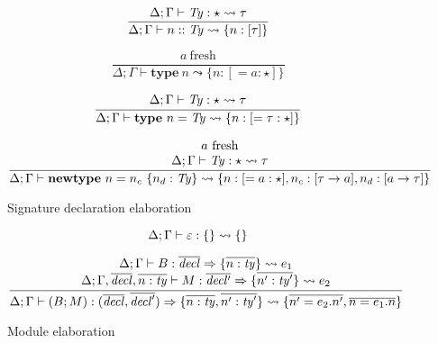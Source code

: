\documentclass{article}
\begin{document}
\begin{figure}[H]

\[
\frac{
\Delta; \Gamma \vdash \mathit{Ty} : \star \leadsto \tau
}{
\Delta; \Gamma \vdash n :: \mathit{Ty} \leadsto \{ n : [ \tau ] \}
}
\]

\[
\frac{
a~\mbox{fresh}
}{
\Delta; \Gamma \vdash \mathbf{type}~n \leadsto \{ n : [ = a : \star ] \}
}
\]

\[
\frac{
\begin{array}{c}
\Delta; \Gamma \vdash \mathit{Ty} : \star \leadsto \tau \\
\end{array}
}{
\Delta; \Gamma \vdash \mathbf{type}~n = \mathit{Ty} \leadsto
    \{ n : [ = \tau : \star ]
    \}
}
\]

\[
\frac{
\begin{array}{c}
a~\mbox{fresh} \\
\Delta; \Gamma \vdash \mathit{Ty} : \star \leadsto \tau \\
\end{array}
}{
\Delta; \Gamma \vdash \mathbf{newtype}~n = n_c~\{ n_d : \mathit{Ty} \} \leadsto
    \{ n : [ = a : \star ]
     , n_c : [\tau \rightarrow a]
     , n_d : [a \rightarrow \tau]
    \}
}
\]
\caption{Signature declaration elaboration}
\end{figure}

\begin{figure}[H]

\[
\Delta; \Gamma \vdash \varepsilon : \{\} \leadsto{} \{\}
\]

\[
\frac{
\begin{array}{c}
\Delta; \Gamma \vdash B : \overline{\mathit{decl}} \Rightarrow \{ \overline{ n : \mathit{ty} } \} \leadsto{} e_1 \\
\Delta; \Gamma, \overline{\mathit{decl}}, \overline{n : \mathit{ty}} \vdash M : \overline{\mathit{decl'}} \Rightarrow \{ \overline{ n' : \mathit{ty}'} \} \leadsto{} e_2
\end{array}
}{
\Delta; \Gamma \vdash (B; M) : (\overline{\mathit{decl}}, \overline{\mathit{decl}'}) \Rightarrow \{ \overline{n : \mathit{ty}}, \overline{n' : \mathit{ty}'} \}
\leadsto{}  \{ \overline{n' = e_2.n'}, \overline{n = e_1.n} \} 
}
\]
\caption{Module elaboration}
\end{figure}
\end{document}
